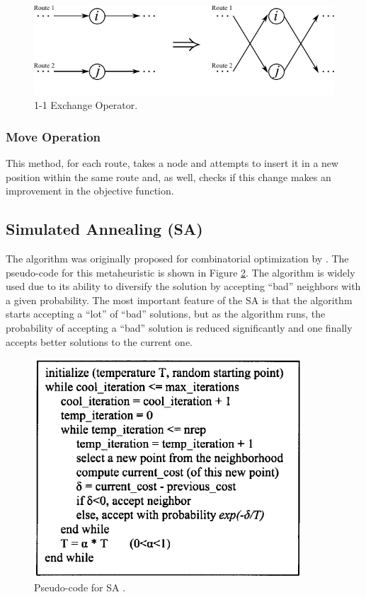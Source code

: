 \documentclass[10pt,twoside]{article}
\begin{document}
\begin{figure}[H]
    \centering
    \includegraphics[scale=0.9]{figs/11ex.pdf}
    \caption{1-1 Exchange Operator.}
    \label{fig:11ex}
\end{figure}

\subsubsection{Move Operation}
This method, for each route, takes a node and attempts to insert it in a new position within the same route and, as well, checks if this change makes an improvement in the objective function.

\subsection{Simulated Annealing (SA)}
The algorithm was originally proposed for combinatorial optimization by \cite{kirkpatrick1983optimization}. The pseudo-code for this metaheuristic is shown in Figure \ref{fig:anneal}. The algorithm is widely used due to its ability to diversify the solution by accepting ``bad'' neighbors with a given probability. The most important feature of the SA is that the algorithm starts accepting a ``lot'' of ``bad'' solutions, but as the algorithm runs, the probability of accepting a ``bad'' solution is reduced significantly and one finally accepts better solutions to the current one.

\begin{figure}[H]
    \centering
    \includegraphics[scale=0.7]{figs/anneal.png}
    \caption{Pseudo-code for SA \citep{ferentinos2002heuristic}.}
    \label{fig:anneal}
\end{figure}
\end{document}

